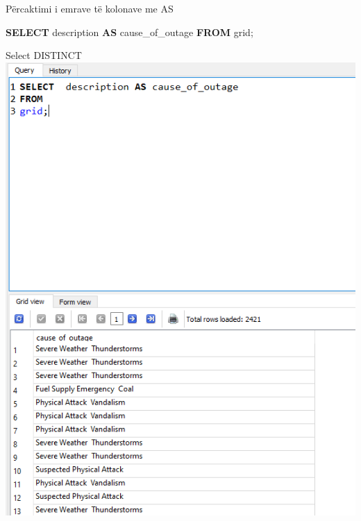 \documentclass[
  ignorenonframetext,
]{beamer}
\newenvironment{Shaded}{\begin{snugshade}}{\end{snugshade}}
\newcommand{\KeywordTok}[1]{\textcolor[rgb]{0.13,0.29,0.53}{\textbf{#1}}}
\newcommand{\NormalTok}[1]{#1}
\begin{document}
\begin{frame}[fragile]{Përcaktimi i emrave të kolonave me AS}
\label{puxebrcaktimi-i-emrave-tuxeb-kolonave-me-as-2}

\begin{Shaded}
\begin{Highlighting}[]
\KeywordTok{SELECT}\NormalTok{  description }\KeywordTok{AS}\NormalTok{ cause\_of\_outage}
\KeywordTok{FROM} 
\NormalTok{grid;}
\end{Highlighting}
\end{Shaded}
\end{frame}

\begin{frame}{Select DISTINCT}
\label{select-distinct-5}
\includegraphics{./Figs/sql22.png}
\end{frame}
\end{document}

